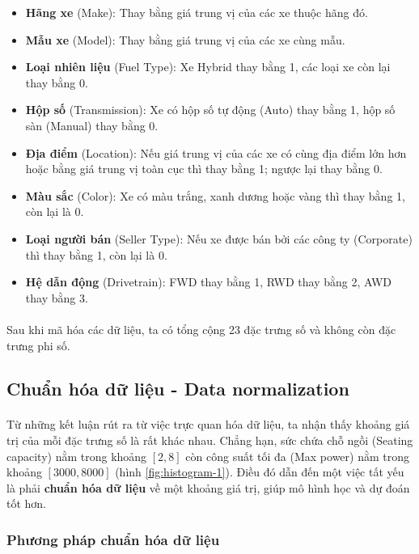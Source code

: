 \begin{itemize}
    \item \textbf{Hãng xe} (Make): Thay bằng giá trung vị của các xe thuộc hãng đó.
    \item \textbf{Mẫu xe} (Model): Thay bằng giá trung vị của các xe cùng mẫu.
    \item \textbf{Loại nhiên liệu} (Fuel Type): Xe Hybrid thay bằng 1, các loại xe còn lại thay bằng 0.
    \item \textbf{Hộp số} (Transmission): Xe có hộp số tự động (Auto) thay bằng 1, hộp số sàn (Manual) thay bằng 0.
    \item \textbf{Địa điểm} (Location): Nếu giá trung vị của các xe có cùng địa điểm lớn hơn hoặc bằng giá trung vị toàn cục thì thay bằng 1; ngược lại thay bằng 0.
    \item \textbf{Màu sắc} (Color): Xe có màu trắng, xanh dương hoặc vàng thì thay bằng 1, còn lại là 0.
    \item \textbf{Loại người bán} (Seller Type): Nếu xe được bán bởi các công ty (Corporate) thì thay bằng 1, còn lại là 0.
    \item \textbf{Hệ dẫn động} (Drivetrain): FWD thay bằng 1, RWD thay bằng 2, AWD thay bằng 3.
\end{itemize}

\paragraph{}{Sau khi mã hóa các dữ liệu, ta có tổng cộng 23 đặc trưng số và không còn đặc trưng phi số.}

\subsection{Chuẩn hóa dữ liệu - Data normalization}

\paragraph{}{Từ những kết luận rút ra từ việc trực quan hóa dữ liệu, ta nhận thấy khoảng giá trị của mỗi đặc trưng số là rất khác nhau. Chẳng hạn, sức chứa chỗ ngồi (Seating capacity) nằm trong khoảng $[2, 8]$ còn công suất tối đa (Max power) nằm trong khoảng $[3000, 8000]$ (hình \ref{fig:histogram-1}). Điều đó dẫn đến một việc tất yếu là phải \textbf{chuẩn hóa dữ liệu} về một khoảng giá trị, giúp mô hình học và dự đoán tốt hơn.}

\subsubsection{Phương pháp chuẩn hóa dữ liệu}
